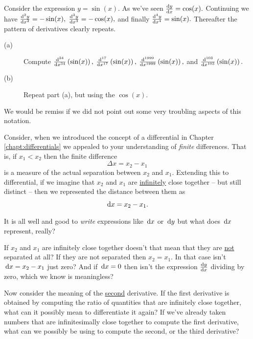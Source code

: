 \begin{myexample}
  Consider the expression $y=\sin(x).$ As we've seen $\frac{\text{d}{y}}{\text{d}{x}}=
  \cos(x).$ Continuing we have $\frac{\text{d}^{2}{y}}{\text{d}{x}^{2}} = -\sin(x),$
  $\frac{\text{d}^{3}{y}}{\text{d}{x}^{3}} = -\cos(x),$ and finally $\frac{\text{d}^{4}{y}}{\text{d}{x}^{4}} =
  \sin(x).$ Thereafter the pattern of derivatives clearly repeats.
\end{myexample}

\begin{embeddedproblem}{}
  \begin{description}
  \item[(a)] Compute $\frac{\text{d}^{34}{}}{\text{d}{x}^{34}}\left(\sin(x)\right),$   $\frac{\text{d}^{17}{}}{\text{d}{x}^{17}}\left(\sin(x)\right),$ $\frac{\text{d}^{1999}{}}{\text{d}{x}^{1999}}\left(\sin(x)\right),$ and
    $\frac{\text{d}^{103}{}}{\text{d}{x}^{103}}\left(\sin(x)\right).$ 
  \item[(b)] Repeat part (a), but using the $\cos(x).$
  \end{description}
\end{embeddedproblem}

We would be remiss if we did not point out some very
troubling aspects of this notation.

Consider, when we introduced the concept of a differential in Chapter
\ref{chapt:differentials} we appealed to your understanding of
\emph{finite} differences. That is, if $x_1<x_2$ then the finite
difference 
$$
\Delta{}x=x_2-x_1
$$
is a measure of the actual separation between $x_2$ and $x_1.$
Extending this to differential, if we imagine that $x_2$ and $x_1$ are
\underline{infinitely} close together -- but still distinct -- then we
represented the distance between them as
$$
\thinspace{\rm d}x = x_2-x_1.
$$

It is all well and good to \emph{write}  expressions like $\thinspace{\rm d}x$ or
$\thinspace{\rm d}y$ but what does $\thinspace{\rm d}x$ represent, really?

If $x_2$ and $x_1$ are infinitely close together doesn't that mean that
they are \underline{not} separated at all? If they are not separated
then $x_2=x_1.$ In that case isn't $\thinspace{\rm d}x =x_2-x_1$ just zero? And if
$\thinspace{\rm d}x =0$ then isn't the expression $\frac{\text{d}{y}}{\text{d}{x}}$ dividing by zero,
which we know is meaningless?

Now consider the meaning of the \underline{second} derivative. If the
first derivative is obtained by computing the ratio of quantities that
are infinitely close together, what can it possibly mean to
differentiate it again? If we've already taken numbers that are
infinitesimally close together to compute the first derivative, what
can we possibly be using to compute the second, or the third
derivative?


